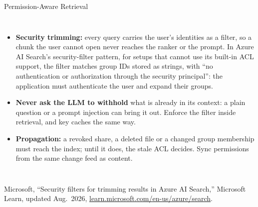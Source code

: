 \begin{frame}{Permission-Aware Retrieval}
\begin{columns}[T,onlytextwidth]
\begin{itemize}
        \item[\textcolor{red}{$\blacktriangleright$}] \textbf{Security trimming:} every query carries the user's identities as a filter, so a chunk the user cannot open never reaches the ranker or the prompt. In Azure AI Search's security-filter pattern, for setups that cannot use its built-in ACL support, the filter matches group IDs stored as strings, with ``no authentication or authorization through the security principal'': the application must authenticate the user and expand their groups.
        \item[\textcolor{red}{$\blacktriangleright$}] \textbf{Never ask the LLM to withhold} what is already in its context: a plain question or a prompt injection can bring it out. Enforce the filter inside retrieval, and key caches the same way.
        \item[\textcolor{red}{$\blacktriangleright$}] \textbf{Propagation:} a revoked share, a deleted file or a changed group membership must reach the index; until it does, the stale ACL decides. Sync permissions from the same change feed as content.
      \end{itemize}
  \end{columns}
  \vspace{0.1em}
  {\scriptsize Microsoft, ``Security filters for trimming results in Azure AI Search,'' Microsoft Learn, updated Aug.\ 2026, \href{https://learn.microsoft.com/en-us/azure/search/search-security-trimming-for-azure-search}{learn.microsoft.com/en-us/azure/search}.}
\end{frame}

